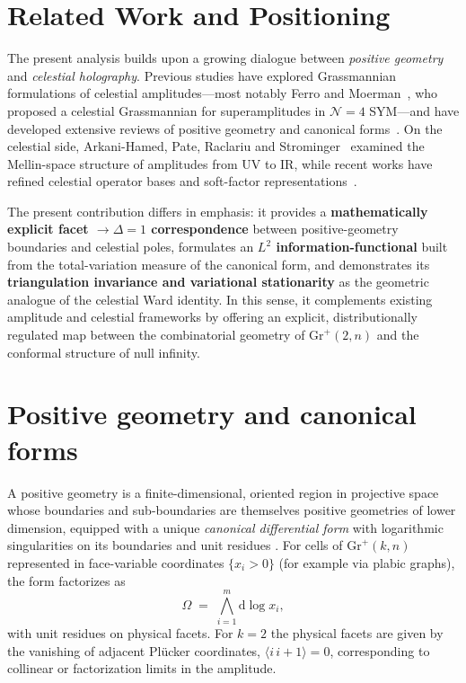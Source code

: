 \documentclass[11pt]{article}
\begin{document}
\section*{Related Work and Positioning}

The present analysis builds upon a growing dialogue between \emph{positive geometry} and \emph{celestial holography}. 
Previous studies have explored Grassmannian formulations of celestial amplitudes—most notably Ferro and Moerman~\cite{FerroMoerman2021}, who proposed a celestial Grassmannian for superamplitudes in $\mathcal{N}=4$ SYM—and have developed extensive reviews of positive geometry and canonical forms~\cite{Herrmann2022PositiveGeometry}. 
On the celestial side, Arkani-Hamed, Pate, Raclariu and Strominger~\cite{ArkaniHamedPateRaclariuStrominger2020} examined the Mellin-space structure of amplitudes from UV to IR, while recent works have refined celestial operator bases and soft-factor representations~\cite{CelestialGluon2023,DiscreteBasis2024}. 

The present contribution differs in emphasis: it provides a \textbf{mathematically explicit facet $\rightarrow \Delta = 1$ correspondence} between positive-geometry boundaries and celestial poles, formulates an \textbf{$L^2$ information-functional} built from the total-variation measure of the canonical form, and demonstrates its \textbf{triangulation invariance and variational stationarity} as the geometric analogue of the celestial Ward identity. 
In this sense, it complements existing amplitude and celestial frameworks by offering an explicit, distributionally regulated map between the combinatorial geometry of $\mathrm{Gr}^+(2,n)$ and the conformal structure of null infinity.

\section{Positive geometry and canonical forms}
A positive geometry is a finite-dimensional, oriented region in projective space whose boundaries and sub-boundaries are themselves positive geometries of lower dimension, equipped with a unique \emph{canonical differential form} with logarithmic singularities on its boundaries and unit residues \citep{ArkaniHamedBaiLam2017}. For cells of $\mathrm{Gr}^+(k,n)$ represented in face-variable coordinates $\{x_i>0\}$ (for example via plabic graphs), the form factorizes as
\begin{equation}
\Omega \;=\; \bigwedge_{i=1}^m \mathrm{d}\!\log x_i,
\end{equation}
with unit residues on physical facets. For $k=2$ the physical facets are given by the vanishing of adjacent Pl\"ucker coordinates, $\langle i\,i{+}1\rangle=0$, corresponding to collinear or factorization limits in the amplitude.
\end{document}
